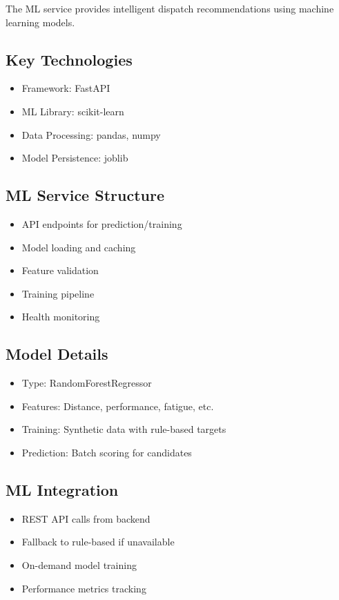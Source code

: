 The ML service provides intelligent dispatch recommendations using machine learning models.

\subsection{Key Technologies}

\begin{itemize}
    \item Framework: FastAPI
    \item ML Library: scikit-learn
    \item Data Processing: pandas, numpy
    \item Model Persistence: joblib
\end{itemize}

\subsection{ML Service Structure}

\begin{itemize}
    \item API endpoints for prediction/training
    \item Model loading and caching
    \item Feature validation
    \item Training pipeline
    \item Health monitoring
\end{itemize}

\subsection{Model Details}

\begin{itemize}
    \item Type: RandomForestRegressor
    \item Features: Distance, performance, fatigue, etc.
    \item Training: Synthetic data with rule-based targets
    \item Prediction: Batch scoring for candidates
\end{itemize}

\subsection{ML Integration}

\begin{itemize}
    \item REST API calls from backend
    \item Fallback to rule-based if unavailable
    \item On-demand model training
    \item Performance metrics tracking
\end{itemize}

